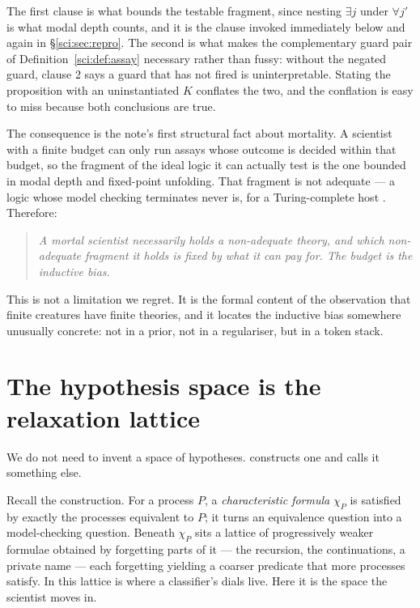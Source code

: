 \begin{remark}
\label{sci:rem:whichasym}
The first clause is what bounds the testable fragment, since nesting $\exists j$ under $\forall j'$
is what modal depth counts, and it is the clause invoked immediately below and again in
\S\ref{sci:sec:repro}. The second is what makes the complementary guard pair of
Definition~\ref{sci:def:assay} necessary rather than fussy: without the negated guard, clause 2 says a
guard that has not fired is uninterpretable. Stating the proposition with an uninstantiated $K$
conflates the two, and the conflation is easy to miss because both conclusions are true.
\end{remark}

The consequence is the note's first structural fact about mortality. A scientist with a finite budget
can only run assays whose outcome is decided within that budget, so the fragment of the ideal logic it
can actually test is the one bounded in modal depth and fixed-point unfolding. That fragment is not
adequate --- a logic whose model checking terminates never is, for a Turing-complete host
\cite[\S1.3]{ClassifierNote}. Therefore:

\begin{quote}
\itshape A mortal scientist necessarily holds a non-adequate theory, and which non-adequate fragment
it holds is fixed by what it can pay for. The budget is the inductive bias.
\end{quote}

This is not a limitation we regret. It is the formal content of the observation that finite creatures
have finite theories, and it locates the inductive bias somewhere unusually concrete: not in a prior,
not in a regulariser, but in a token stack.

\section{The hypothesis space is the relaxation lattice}\label{sci:S5}
\label{sci:sec:lattice}

We do not need to invent a space of hypotheses. \cite[\S3.3]{ClassifierNote} constructs one and calls
it something else.

Recall the construction. For a process $P$, a \emph{characteristic formula} $\chi_P$ is satisfied by
exactly the processes equivalent to $P$; it turns an equivalence question into a model-checking
question. Beneath $\chi_P$ sits a lattice of progressively weaker formulae obtained by forgetting
parts of it --- the recursion, the continuations, a private name --- each forgetting yielding a
coarser predicate that more processes satisfy. In \cite{ClassifierNote} this lattice is where a
classifier's dials live. Here it is the space the scientist moves in.

